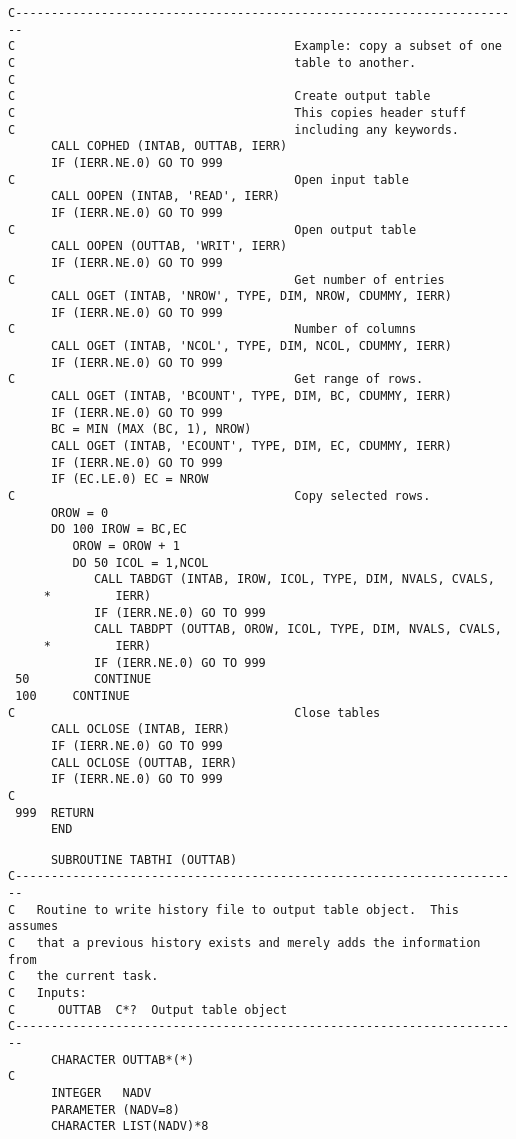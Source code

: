 {\begin{verbatim}
C-----------------------------------------------------------------------
C                                       Example: copy a subset of one
C                                       table to another.
C
C                                       Create output table
C                                       This copies header stuff
C                                       including any keywords.
      CALL COPHED (INTAB, OUTTAB, IERR)
      IF (IERR.NE.0) GO TO 999
C                                       Open input table
      CALL OOPEN (INTAB, 'READ', IERR)
      IF (IERR.NE.0) GO TO 999
C                                       Open output table
      CALL OOPEN (OUTTAB, 'WRIT', IERR)
      IF (IERR.NE.0) GO TO 999
C                                       Get number of entries
      CALL OGET (INTAB, 'NROW', TYPE, DIM, NROW, CDUMMY, IERR)
      IF (IERR.NE.0) GO TO 999
C                                       Number of columns
      CALL OGET (INTAB, 'NCOL', TYPE, DIM, NCOL, CDUMMY, IERR)
      IF (IERR.NE.0) GO TO 999
C                                       Get range of rows.
      CALL OGET (INTAB, 'BCOUNT', TYPE, DIM, BC, CDUMMY, IERR)
      IF (IERR.NE.0) GO TO 999
      BC = MIN (MAX (BC, 1), NROW)
      CALL OGET (INTAB, 'ECOUNT', TYPE, DIM, EC, CDUMMY, IERR)
      IF (IERR.NE.0) GO TO 999
      IF (EC.LE.0) EC = NROW
C                                       Copy selected rows.
      OROW = 0
      DO 100 IROW = BC,EC
         OROW = OROW + 1
         DO 50 ICOL = 1,NCOL
            CALL TABDGT (INTAB, IROW, ICOL, TYPE, DIM, NVALS, CVALS,
     *         IERR)
            IF (IERR.NE.0) GO TO 999
            CALL TABDPT (OUTTAB, OROW, ICOL, TYPE, DIM, NVALS, CVALS,
     *         IERR)
            IF (IERR.NE.0) GO TO 999
 50         CONTINUE
 100     CONTINUE
C                                       Close tables
      CALL OCLOSE (INTAB, IERR)
      IF (IERR.NE.0) GO TO 999
      CALL OCLOSE (OUTTAB, IERR)
      IF (IERR.NE.0) GO TO 999
C
 999  RETURN
      END
\end{verbatim}
\begin{verbatim}
      SUBROUTINE TABTHI (OUTTAB)
C-----------------------------------------------------------------------
C   Routine to write history file to output table object.  This assumes
C   that a previous history exists and merely adds the information from
C   the current task.
C   Inputs:
C      OUTTAB  C*?  Output table object
C-----------------------------------------------------------------------
      CHARACTER OUTTAB*(*)
C
      INTEGER   NADV
      PARAMETER (NADV=8)
      CHARACTER LIST(NADV)*8

\end{verbatim}}
